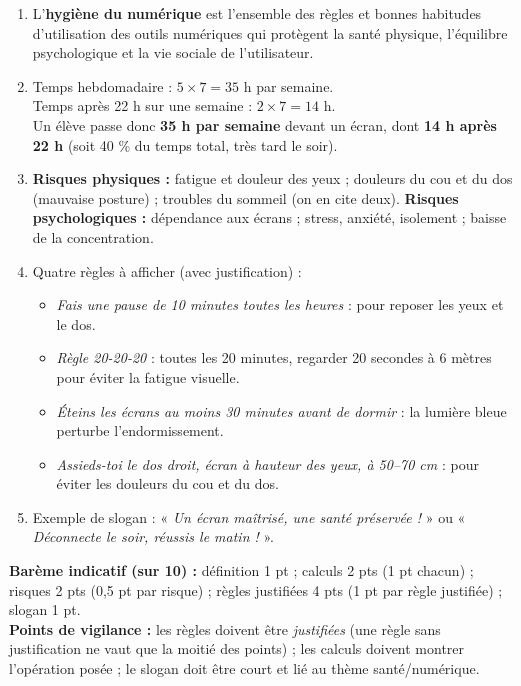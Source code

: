 \documentclass[11pt]{article}
\begin{document}
\begin{corrige}
\begin{enumerate}
\item L'\textbf{hygiène du numérique} est l'ensemble des règles et bonnes habitudes d'utilisation des outils numériques qui protègent la santé physique, l'équilibre psychologique et la vie sociale de l'utilisateur.
\item Temps hebdomadaire : $5 \times 7 = 35$ h par semaine.\\
Temps après 22 h sur une semaine : $2 \times 7 = 14$ h.\\
Un élève passe donc \textbf{35 h par semaine} devant un écran, dont \textbf{14 h après 22 h} (soit 40 \% du temps total, très tard le soir).
\item \textbf{Risques physiques :} fatigue et douleur des yeux ; douleurs du cou et du dos (mauvaise posture) ; troubles du sommeil (on en cite deux). \textbf{Risques psychologiques :} dépendance aux écrans ; stress, anxiété, isolement ; baisse de la concentration.
\item Quatre règles à afficher (avec justification) :
\begin{itemize}
\item \emph{Fais une pause de 10 minutes toutes les heures} : pour reposer les yeux et le dos.
\item \emph{Règle 20-20-20} : toutes les 20 minutes, regarder 20 secondes à 6 mètres pour éviter la fatigue visuelle.
\item \emph{Éteins les écrans au moins 30 minutes avant de dormir} : la lumière bleue perturbe l'endormissement.
\item \emph{Assieds-toi le dos droit, écran à hauteur des yeux, à 50--70 cm} : pour éviter les douleurs du cou et du dos.
\end{itemize}
\item Exemple de slogan : « \emph{Un écran maîtrisé, une santé préservée !} » ou « \emph{Déconnecte le soir, réussis le matin !} ».
\end{enumerate}
\textbf{Barème indicatif (sur 10) :} définition 1 pt ; calculs 2 pts (1 pt chacun) ; risques 2 pts (0,5 pt par risque) ; règles justifiées 4 pts (1 pt par règle justifiée) ; slogan 1 pt.\\
\textbf{Points de vigilance :} les règles doivent être \emph{justifiées} (une règle sans justification ne vaut que la moitié des points) ; les calculs doivent montrer l'opération posée ; le slogan doit être court et lié au thème santé/numérique.
\end{corrige}
\end{document}

